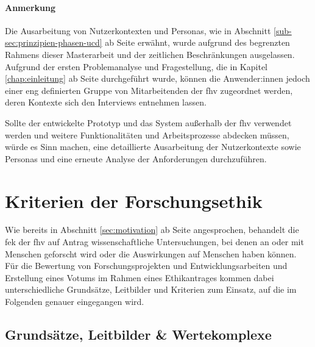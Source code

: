 \documentclass[a4paper,12pt,twoside]{scrreprt}
\begin{document}
\subsubsection*{Anmerkung}
\label{sub-sub-sec:ucd-verknüpfung-anmerkung}

Die Ausarbeitung von Nutzerkontexten und Personas, wie in Abschnitt \ref{sub-sec:prinzipien-phasen-ucd} ab Seite \pageref{sub-sec:prinzipien-phasen-ucd} erwähnt, wurde aufgrund des begrenzten Rahmens dieser Masterarbeit und der zeitlichen Beschränkungen ausgelassen. Aufgrund der ersten Problemanalyse und Fragestellung, die in Kapitel \ref{chap:einleitung} ab Seite \pageref{chap:einleitung} durchgeführt wurde, können die Anwender:innen jedoch einer eng definierten Gruppe von Mitarbeitenden der \ac{fhv} zugeordnet werden, deren Kontexte sich den Interviews entnehmen lassen.

Sollte der entwickelte Prototyp und das System außerhalb der \acl{fhv} verwendet werden und weitere Funktionalitäten und Arbeitsprozesse abdecken müssen, würde es Sinn machen, eine detaillierte Ausarbeitung der Nutzerkontexte sowie Personas und eine erneute Analyse der Anforderungen durchzuführen.

\cleardoublepage
\chapter{Kriterien der Forschungsethik}
\label{chap:kriterien-forschungsethik}

Wie bereits in Abschnitt \ref{sec:motivation} ab Seite \pageref{chap:einleitung} angesprochen, behandelt die \acl{fek} der \acl{fhv} auf Antrag wissenschaftliche Untersuchungen, bei denen an oder mit Menschen geforscht wird oder die Auswirkungen auf Menschen haben können. \cite{fachhochschule_vorarlberg_gmbh_forschungsethik-kommission_2021} Für die Bewertung von Forschungsprojekten und Entwicklungsarbeiten und Erstellung eines Votums im Rahmen eines Ethikantrages kommen dabei unterschiedliche Grundsätze, Leitbilder und Kriterien zum Einsatz, auf die im Folgenden genauer eingegangen wird.

\section{Grundsätze, Leitbilder \& Wertekomplexe}
\label{sec:grundsätze-leitbilder-wertekomplexe}
\end{document}

